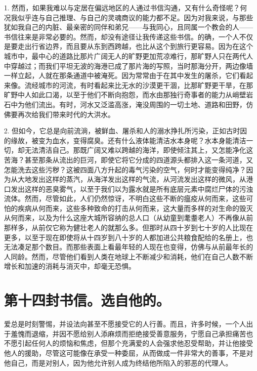1. 然而，如果我难以与定居在偏远地区的人通过书信沟通，又有什么奇怪呢？何况我似乎连与自己推理、与自己的灵魂商议的能力都不足。因为对我来说，与那些犹如我自己的内脏、最亲密的同伴和弟兄——与我同心，且同属一个教会的人——书信往来是非常必要的。然而，却没有途径让我传递这些书信。的确，一个人不仅是要走出行省边界，而且要从东到西跨越，也比从这个到旅行更容易。因为在这个城市中，最中心的道路比那片广阔无人的旷野更加荒凉难行，那旷野人只在两代人中穿越过；而我们平坦无波的海港已成了那片海的写照，当时那海分开，两边像墙一样立起，人就在那条通道中被淹死。因为常常由于在其中发生的屠杀，它们看起来像。流经城市的河流，有时看起来比无水的沙漠更干涸，比那旷野更干旱，在那旷野中人如此口渴，以至于他们不断向抱怨，而水由那独行奇事者的能力从峭壁岩石中为他们流出。有时，河水又泛滥高涨，淹没周围的一切土地、道路和田野，仿佛要再次给我们带来时代的大洪水。\par

2. 但如今，它总是向前流淌，被鲜血、屠杀和人的溺水挣扎所污染，正如古时因的缘故，被变为血水，变得腐臭。还有什么液体能清洁水本身呢？水本身能清洁一切，却无法清洁自己。那既广阔又难以跨越的海洋，即使倾注其上，又怎能净化这苦海？甚至那条从流出的巨河，即使它将它分成的四道源头都排入这一条河道，又怎能洗去这些污秽？这被四面八方升起的毒气污染的空气，何时才能变得纯净？因为从大地发出这样的蒸汽，从海洋发出这样的气流，从河流发出这样的微风，从港口发出这样的恶臭雾气，以至于我们以为露水就是所有底层元素中腐烂尸体的污浊流体。然而，尽管如此，人们仍然惊讶，不明白这些不断的瘟疫从何而来，这些可怕的疾病从何而来，这些多种致命的打击从何而来，这大量而多样的对生命的毁灭从何而来，以及为什么这座大城所容纳的总人口（从幼童到耄耋老人）不再像从前那样多，从前仅它称为健壮老人的就那么多。但那时从四十岁到七十岁的人比现在更多，以至于现在即使将从十四岁到八十岁的人都加进公共粮食配给的名册上，也无法凑足那个数目。而那些表面上看最年轻的人现在也变得，仿佛与从前最年长的人同龄。然而，尽管他们看到人类在地球上不断减少和消耗，他们在自己人数不断增长和加速的消耗与消灭中，却毫无恐惧。\par


\section{第十四封书信。选自他的。}

爱总是时刻警惕，并设法向甚至不愿接受它的人行善。而且，许多时候，一个人出于羞愧而退缩，并因不愿给别人添麻烦而拒绝接受善意服务，宁愿自己承担痛苦也不愿引起任何人的烦恼和焦虑，但那个充满爱的人会强求他忍受帮助，并让他接受他人的援助，尽管这可能像在承受一种委屈，从而做成一件非常大的善事，不是对他自己，而是对别人，因为他允许别人成为终结他所陷入的邪恶的代理人。\par

